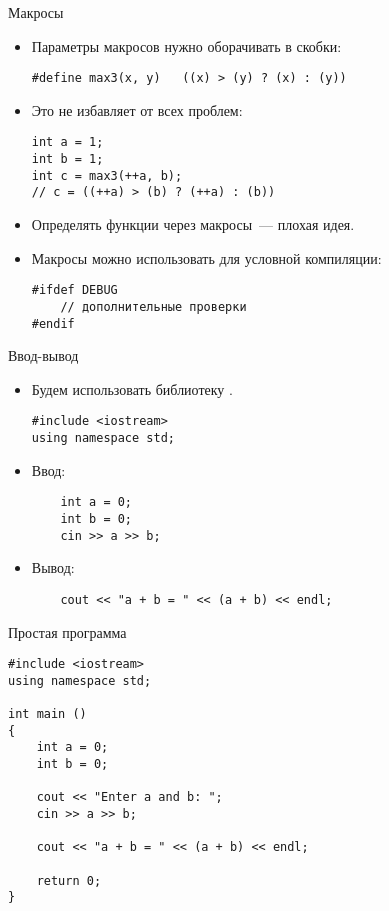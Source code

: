 \documentclass[aspectration=1610,t]{beamer}
\begin{document}
\begin{frame}[fragile]{Макросы}
\begin{itemize}
    \item Параметры макросов нужно оборачивать в скобки:
    \begin{lstlisting}
#define max3(x, y)   ((x) > (y) ? (x) : (y))
    \end{lstlisting}

    \item Это не избавляет от всех проблем:
    \begin{lstlisting}
int a = 1;
int b = 1;
int c = max3(++a, b); 
// c = ((++a) > (b) ? (++a) : (b))
    \end{lstlisting}

    \item Определять функции через макросы~--- плохая идея.

    \item Макросы можно использовать для условной компиляции:
        \begin{lstlisting}
#ifdef DEBUG
    // дополнительные проверки
#endif
        \end{lstlisting}

\end{itemize}
\end{frame}

\begin{frame}[fragile]{Ввод-вывод}
\begin{itemize}    
    \item Будем использовать библиотеку .
    \begin{lstlisting}
#include <iostream>
using namespace std;
    \end{lstlisting}

    \item Ввод:
    \begin{lstlisting}
    int a = 0;
    int b = 0;
    cin >> a >> b;
    \end{lstlisting}

    \item Вывод:
    \begin{lstlisting}
    cout << "a + b = " << (a + b) << endl;
    \end{lstlisting}
\end{itemize}
\end{frame}

\begin{frame}[fragile]{Простая программа}
    \begin{lstlisting}
#include <iostream>
using namespace std;

int main () 
{
    int a = 0;
    int b = 0;

    cout << "Enter a and b: ";
    cin >> a >> b;

    cout << "a + b = " << (a + b) << endl;

    return 0;
}
    \end{lstlisting}
\end{frame}
\end{document}
